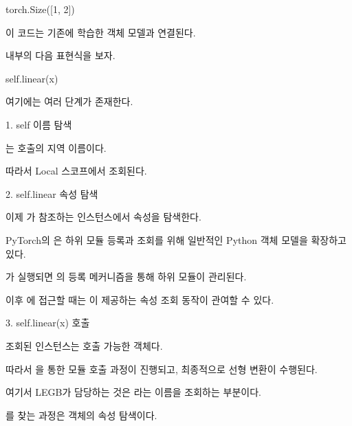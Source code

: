 \begin{dhkzsh}
torch.Size([1, 2])
\end{dhkzsh}

이 코드는 기존에 학습한  객체 모델과 연결된다.

 내부의 다음 표현식을 보자.

\begin{dhkcode}
self.linear(x)
\end{dhkcode}

여기에는 여러 단계가 존재한다.

\begin{dhknote}
\begin{dhksmry}[centered]
1. self 이름 탐색
\end{dhksmry}
\end{dhknote}

는  호출의 지역 이름이다.

따라서 Local 스코프에서 조회된다.

\begin{dhknote}
\begin{dhksmry}[centered]
2. self.linear 속성 탐색
\end{dhksmry}
\end{dhknote}

이제 가 참조하는  인스턴스에서  속성을 탐색한다.

PyTorch의 은 하위 모듈 등록과 조회를 위해 일반적인 Python 객체 모델을 확장하고 있다.

가 실행되면 의 등록 메커니즘을 통해 하위 모듈이 관리된다.

이후 에 접근할 때는 이 제공하는 속성 조회 동작이 관여할 수 있다.

\begin{dhknote}
\begin{dhksmry}[centered]
3. self.linear(x) 호출
\end{dhksmry}
\end{dhknote}

조회된  인스턴스는 호출 가능한 객체다.

따라서 을 통한 모듈 호출 과정이 진행되고, 최종적으로 선형 변환이 수행된다.

여기서 LEGB가 담당하는 것은 라는 이름을 조회하는 부분이다.

를 찾는 과정은 객체의 속성 탐색이다.

